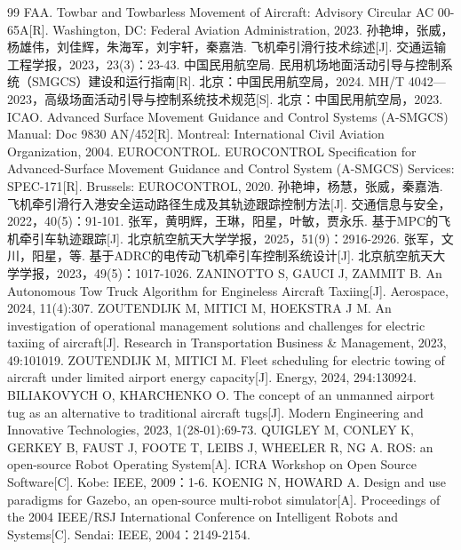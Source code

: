 \begin{thebibliography}{99}
 FAA. Towbar and Towbarless Movement of Aircraft: Advisory Circular AC 00-65A{[}R{]}. Washington, DC: Federal Aviation Administration, 2023.
 孙艳坤，张威，杨雄伟，刘佳辉，朱海军，刘宇轩，秦嘉浩. 飞机牵引滑行技术综述{[}J{]}. 交通运输工程学报，2023，23(3)：23-43.
 中国民用航空局. 民用机场地面活动引导与控制系统（SMGCS）建设和运行指南{[}R{]}. 北京：中国民用航空局，2024.
 MH/T 4042---2023，高级场面活动引导与控制系统技术规范{[}S{]}. 北京：中国民用航空局，2023.
 ICAO. Advanced Surface Movement Guidance and Control Systems (A-SMGCS) Manual: Doc 9830 AN/452{[}R{]}. Montreal: International Civil Aviation Organization, 2004.
 EUROCONTROL. EUROCONTROL Specification for Advanced-Surface Movement Guidance and Control System (A-SMGCS) Services: SPEC-171{[}R{]}. Brussels: EUROCONTROL, 2020.
 孙艳坤，杨慧，张威，秦嘉浩. 飞机牵引滑行入港安全运动路径生成及其轨迹跟踪控制方法{[}J{]}. 交通信息与安全，2022，40(5)：91-101.
 张军，黄明辉，王琳，阳星，叶敏，贾永乐. 基于MPC的飞机牵引车轨迹跟踪{[}J{]}. 北京航空航天大学学报，2025，51(9)：2916-2926.
 张军，文川，阳星，等. 基于ADRC的电传动飞机牵引车控制系统设计{[}J{]}. 北京航空航天大学学报，2023，49(5)：1017-1026.
 ZANINOTTO S, GAUCI J, ZAMMIT B. An Autonomous Tow Truck Algorithm for Engineless Aircraft Taxiing{[}J{]}. Aerospace, 2024, 11(4):307.
 ZOUTENDIJK M, MITICI M, HOEKSTRA J M. An investigation of operational management solutions and challenges for electric taxiing of aircraft{[}J{]}. Research in Transportation Business \& Management, 2023, 49:101019.
 ZOUTENDIJK M, MITICI M. Fleet scheduling for electric towing of aircraft under limited airport energy capacity{[}J{]}. Energy, 2024, 294:130924.
 BILIAKOVYCH O, KHARCHENKO O. The concept of an unmanned airport tug as an alternative to traditional aircraft tugs{[}J{]}. Modern Engineering and Innovative Technologies, 2023, 1(28-01):69-73.
 QUIGLEY M, CONLEY K, GERKEY B, FAUST J, FOOTE T, LEIBS J, WHEELER R, NG A. ROS: an open-source Robot Operating System{[}A{]}. ICRA Workshop on Open Source Software{[}C{]}. Kobe: IEEE, 2009：1-6.
 KOENIG N, HOWARD A. Design and use paradigms for Gazebo, an open-source multi-robot simulator{[}A{]}. Proceedings of the 2004 IEEE/RSJ International Conference on Intelligent Robots and Systems{[}C{]}. Sendai: IEEE, 2004：2149-2154.

\end{thebibliography}
